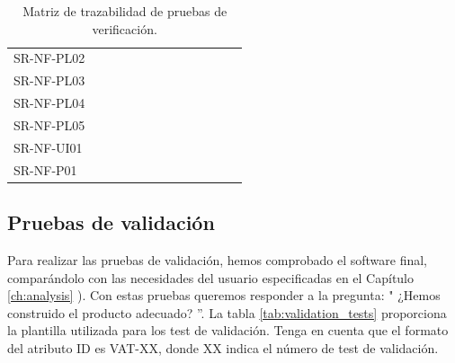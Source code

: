 \begin{table}[htb]
\begin{tabular}{@{}L{3cm}C{0.7cm}C{0.7cm}C{0.7cm}C{0.7cm}C{0.7cm}C{0.7cm}C{0.7cm}C{0.7cm}C{0.7cm}C{0.7cm}C{0.7cm}C{0.7cm}@{}}
    SR-NF-PL02 &  & & & & & & & & & & & \\
    SR-NF-PL03 & &  & & & & & & & & & & \\
    SR-NF-PL04 & &  & & & & & & & & & & \\
    SR-NF-PL05 & & &  & & & & & & & & & \\
    SR-NF-UI01 & & & &  & & & & & & & & \\
    SR-NF-P01 & & & & &  & & & & & & & \\
    \bottomrule
\end{tabular}
\caption{Matriz de trazabilidad de pruebas de verificación.}
\label{tab:verification_matrix}
\end{table}    

\clearpage

\subsection{Pruebas de validación}


Para realizar las pruebas de validación, hemos comprobado el software final, comparándolo con las necesidades del usuario especificadas en el Capítulo \ref{ch:analysis} \textit{}). Con estas pruebas queremos responder a la pregunta: " ¿Hemos construido el producto adecuado? ''. La tabla \ref{tab:validation_tests} proporciona la plantilla utilizada para los test de validación. Tenga en cuenta que el formato del atributo ID es VAT-XX, donde XX indica el número de test de validación.


